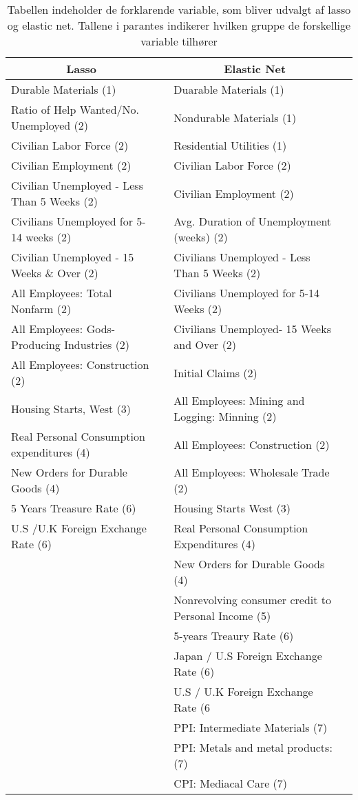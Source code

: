  \begin{table}
\small
\center
\begin{tabular}{lc  | lc}
\toprule
\multicolumn{1}{c}{Lasso} &&   \multicolumn{1}{c}{Elastic Net} \\ \midrule
Durable Materials (1)  && Duarable Materials (1)  \\
Ratio of Help Wanted/No. Unemployed (2) &&  Nondurable Materials (1)\\
Civilian Labor Force (2)  & & Residential Utilities (1) \\
Civilian Employment  (2) &&  Civilian Labor Force (2)\\
Civilian Unemployed - Less Than 5 Weeks (2)  && Civilian Employment (2) & \\
Civilians Unemployed for 5-14 weeks (2) & & Avg. Duration of Unemployment (weeks) (2)\\
Civilian Unemployed - 15 Weeks \& Over (2) && Civilians Unemployed - Less Than 5 Weeks (2)  \\
All Employees: Total Nonfarm (2) && Civilians Unemployed for 5-14 Weeks (2) &\\
All Employees: Gods-Producing Industries (2) && Civilians Unemployed- 15 Weeks and Over (2) \\
All Employees: Construction (2) && Initial Claims (2) \\
Housing Starts, West (3) & & All Employees: Mining and Logging: Minning (2)\\
Real Personal Consumption expenditures (4) && All Employees: Construction (2) \\
New Orders for Durable Goods (4) &  & All Employees:  Wholesale Trade (2) \\
5 Years Treasure Rate (6) && Housing Starts West (3) \\
U.S /U.K Foreign Exchange Rate  (6)  & & Real Personal Consumption Expenditures (4)\\ 
&&New Orders for Durable Goods (4) \\
&& Nonrevolving consumer credit to Personal Income (5) \\
&& 5-years Treaury Rate (6)  \\
&& Japan / U.S Foreign Exchange Rate (6) \\
&&U.S / U.K Foreign Exchange Rate (6 \\
&& PPI: Intermediate Materials (7) \\
&&PPI: Metals and metal products:(7) \\
&&CPI: Mediacal Care (7) \\ \bottomrule 
\end{tabular}
\caption{Tabellen indeholder de forklarende variable, som bliver udvalgt af lasso og elastic net. Tallene i parantes indikerer hvilken gruppe de forskellige variable tilhører} \label{tab: lasso_ud}
\end{table}
